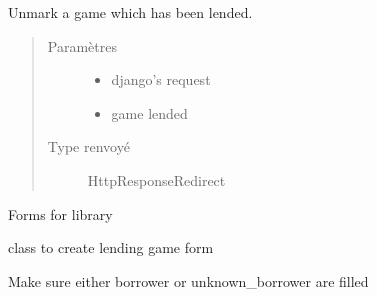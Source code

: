 \documentclass[letterpaper,10pt,french]{sphinxmanual}
\begin{document}

\begin{fulllineitems}
\label{\detokenize{library:library.views.unmark_lended}}
Unmark a game which has been lended.
\begin{quote}\begin{description}
\item[{Paramètres}] \leavevmode\begin{itemize}
\item {}
 \textendash{} django’s request

\item {}
 \textendash{} game lended

\end{itemize}

\item[{Type renvoyé}] \leavevmode
HttpResponseRedirect

\end{description}\end{quote}

\end{fulllineitems}

\label{\detokenize{library:module-library.forms}}
Forms for library

\begin{fulllineitems}
\label{\detokenize{library:library.forms.LendGameForm}}
class to create lending game form

\begin{fulllineitems}
\label{\detokenize{library:library.forms.LendGameForm.clean}}
Make sure either borrower or unknown\_borrower are filled

\end{fulllineitems}


\end{fulllineitems}
\end{document}
